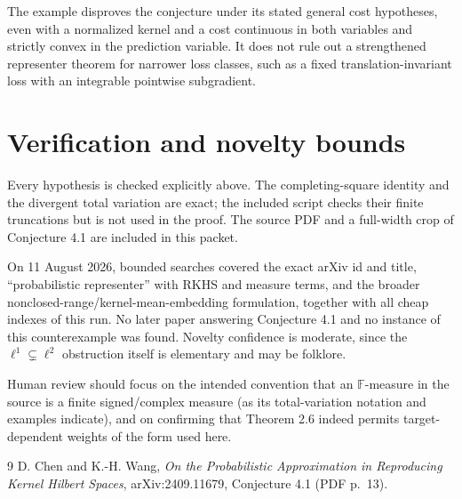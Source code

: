 \documentclass[11pt]{article}
\begin{document}
The example disproves the conjecture under its stated general cost
hypotheses, even with a normalized kernel and a cost continuous in both
variables and strictly convex in the prediction variable.  It does not rule
out a strengthened representer theorem for narrower loss classes, such as a
fixed translation-invariant loss with an integrable pointwise subgradient.

\section*{Verification and novelty bounds}

Every hypothesis is checked explicitly above.  The completing-square identity
and the divergent total variation are exact; the included script checks their
finite truncations but is not used in the proof.  The source PDF and a
full-width crop of Conjecture 4.1 are included in this packet.

On 11 August 2026, bounded searches covered the exact arXiv id and title,
``probabilistic representer'' with RKHS and measure terms, and the broader
nonclosed-range/kernel-mean-embedding formulation, together with all cheap
indexes of this run.  No later paper answering Conjecture 4.1 and no instance
of this counterexample was found.  Novelty confidence is moderate, since the
$\ell^1\subsetneq\ell^2$ obstruction itself is elementary and may be folklore.

Human review should focus on the intended convention that an
$\mathbb F$-measure in the source is a finite signed/complex measure (as its
total-variation notation and examples indicate), and on confirming that
Theorem 2.6 indeed permits target-dependent weights of the form used here.

\begin{thebibliography}{9}
D. Chen and K.-H. Wang,
\emph{On the Probabilistic Approximation in Reproducing Kernel Hilbert Spaces},
arXiv:2409.11679, Conjecture 4.1 (PDF p.~13).
\end{thebibliography}
\end{document}
